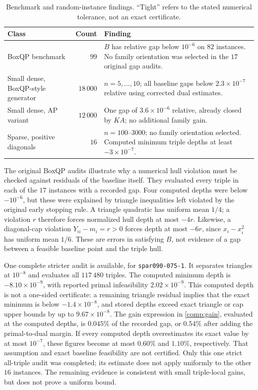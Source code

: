 \begin{table}[htbp]
\centering
\small
\caption{Benchmark and random-instance findings. ``Tight'' refers to
the stated numerical tolerance, not an exact certificate.}
\label{comp:natural-table}
\begin{tabular}{p{.25\linewidth}rp{.53\linewidth}}
\toprule
Class & Count & Finding\\
\midrule
BoxQP benchmark & $99$ & $B$ has relative gap below $10^{-6}$ on
$82$ instances. No family orientation was selected in the $17$
original gap audits.\\
Small dense, BoxQP-style generator & $18\,000$ & $n=5,\ldots,10$;
all baseline gaps below $2.3\times10^{-7}$ relative using corrected
dual estimates.\\
Small dense, AP variant & $12\,000$ & One gap of
$3.6\times10^{-6}$ relative, already closed by $KA$; no additional
family gain.\\
Sparse, positive diagonals & $16$ & $n=100$--$3000$; no family
orientation selected. Computed minimum triple depths at least
$-3\times10^{-7}$.\\
\bottomrule
\end{tabular}
\end{table}

The original BoxQP audits illustrate why a numerical hull violation
must be checked against residuals of the baseline itself.
They evaluated every triple in each of the $17$ instances with a
recorded gap. Four computed depths were below $-10^{-6}$, but these
were explained by triangle inequalities left violated by the original
early stopping rule. A triangle quadratic has uniform mean $1/4$;
a violation $r$ therefore forces normalized hull depth at most $-4r$.
Likewise, a diagonal-cap violation $Y_{ii}-m_i=r>0$ forces depth
at most $-6r$, since $x_i-x_i^2$ has uniform mean $1/6$.
These are errors in satisfying $B$, not evidence of a gap between a
feasible baseline point and the triple hull.

One complete stricter audit is available, for \texttt{spar090-075-1}.
It separates triangles at $10^{-8}$ and evaluates all $117\,480$
triples. The computed minimum depth is $-8.10\times10^{-9}$,
with reported primal infeasibility $2.02\times10^{-9}$. This computed
depth is not a one-sided certificate: a remaining triangle residual
implies that the exact minimum is below $-1.4\times10^{-8}$,
and stored depths exceed exact triangle or cap upper bounds by up
to $9.67\times10^{-8}$.
The gain expression in \eqref{comp:gain}, evaluated at the computed
depths, is $0.045\%$ of the recorded gap, or $0.54\%$ after adding
the primal-to-dual margin. If every computed depth overestimates its
exact value by at most $10^{-7}$, these figures become at most
$0.60\%$ and $1.10\%$, respectively. That assumption and exact
baseline feasibility are not certified. Only this one strict
all-triple audit was completed; its estimate does not apply uniformly
to the other $16$ instances. The remaining evidence is consistent
with small triple-local gains, but does not prove a uniform bound.

